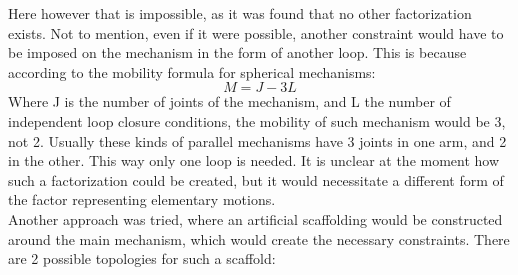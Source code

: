 Here however that is impossible, as it was found that no other factorization exists. Not to mention, even if it were possible, another constraint would have to be imposed on the mechanism in the form of another loop. This is because according to the mobility formula for spherical mechanisms:
\begin{equation}
    M = J - 3L
\end{equation}
Where J is the number of joints of the mechanism, and L the number of independent loop closure conditions, the mobility of such mechanism would be 3, not 2. Usually these kinds of parallel mechanisms have 3 joints in one arm, and 2 in the other. This way only one loop is needed. It is unclear at the moment how such a factorization could be created, but it would necessitate a different form of the factor representing elementary motions. \\
Another approach was tried, where an artificial scaffolding would be constructed around the main mechanism, which would create the necessary constraints. There are 2 possible topologies for such a scaffold:
